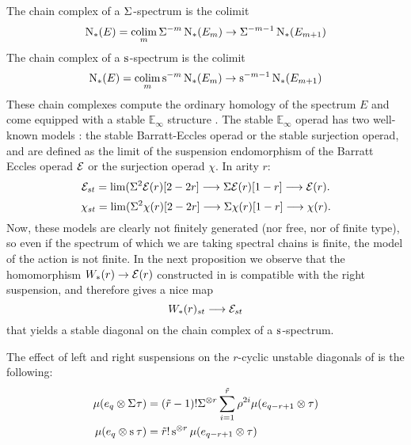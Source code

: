 The chain complex of a $\Sigma^{}$-spectrum is the colimit
\[
 \operatorname{N}_{*}(E) = \operatorname*{colim}_m \Sigma^{-m} \operatorname{N}_{*}(E_m) \to \Sigma^{-m-1} \operatorname{N}_{*}(E_{m+1})
\]
The chain complex of a $\operatorname{s}^{}$-spectrum is the colimit
\[
 \operatorname{N}_{*}(E) = \operatorname*{colim}_m \operatorname{s}^{-m} \operatorname{N}_{*}(E_m) \to \operatorname{s}^{-m-1} \operatorname{N}_{*}(E_{m+1})
\]
These chain complexes compute the ordinary homology of the spectrum $E$ and come equipped with a stable $\mathbb{E}_\infty$ structure \cite{Gill2020}. The stable $\mathbb{E}_\infty$ operad has two well-known models \cite[Appendix]{berger2004combinatorial}: the stable Barratt-Eccles operad or the stable surjection operad, and are defined as the limit of the suspension endomorphism of the Barratt Eccles operad $\mathcal{E}$ or the surjection operad $\chi$. In arity $r$:
\[\mathcal{E}_{st} = \lim( \Sigma^2\mathcal{E}(r)[2-2r] \longrightarrow \Sigma \mathcal{E}(r)[1-r] \longrightarrow \mathcal{E}(r).\]
\[\chi_{st} = \lim( \Sigma^2\chi(r)[2-2r] \longrightarrow \Sigma \chi(r)[1-r] \longrightarrow \chi(r).\]
Now, these models are clearly not finitely generated (nor free, nor of finite type), so even if the spectrum of which we are taking spectral chains is finite, the model of the action is not finite. In the next proposition we observe that the homomorphism $W_*(r) \to \mathcal{E}(r)$ constructed in \cite{medina2021may_st} is compatible with the right suspension, and therefore gives a nice map
\[
 W_*(r)_{st} \longrightarrow \mathcal{E}_{st}
\]
that yields a stable diagonal on the chain complex of a $\operatorname{s}^{}$-spectrum.

\begin{proposition}\label{prop:suspensionunstable}
 The effect of left and right suspensions on the $r$-cyclic unstable diagonals of \cite{medina2021may_st} is the following:
 \begin{align*}
 \mu(e_q \otimes \Sigma^{} \tau) &= (\tilde{r}-1)!\Sigma^{\otimes r}\sum_{i=1}^{\tilde{r}} \rho^{2i}\mu(e_{q-r+1} \otimes \tau)
 \\
 \mu(e_q \otimes \operatorname{s}^{}\tau) &= \tilde{r}!\operatorname{s}^{\otimes r}\mu(e_{q-r+1} \otimes \tau)
 \end{align*}
\end{proposition}

